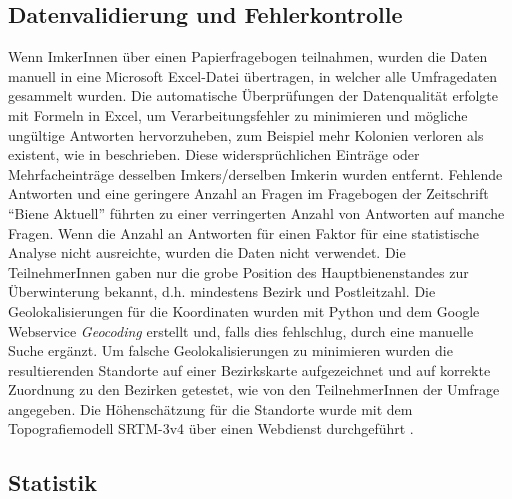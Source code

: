 \subsection{Datenvalidierung und Fehlerkontrolle}

Wenn ImkerInnen über einen Papierfragebogen teilnahmen, wurden die Daten manuell in eine Microsoft Excel-Datei übertragen, in welcher alle Umfragedaten gesammelt wurden. Die automatische Überprüfungen der Datenqualität erfolgte mit Formeln in Excel, um Verarbeitungsfehler zu minimieren und mögliche ungültige Antworten hervorzuheben, zum Beispiel mehr Kolonien verloren als existent, wie in \cite{vanderzee2013, brodschneider2013} beschrieben. Diese widersprüchlichen Einträge oder Mehrfacheinträge desselben Imkers/derselben Imkerin wurden entfernt. Fehlende Antworten und eine geringere Anzahl an Fragen im Fragebogen der Zeitschrift \enquote{Biene Aktuell} führten zu einer verringerten Anzahl von Antworten auf manche Fragen. Wenn die Anzahl an Antworten für einen Faktor für eine statistische Analyse nicht ausreichte, wurden die Daten nicht verwendet.
\newline
Die TeilnehmerInnen gaben nur die grobe Position des Hauptbienenstandes zur Überwinterung bekannt, d.h. mindestens Bezirk und Postleitzahl. Die Geolokalisierungen für die Koordinaten wurden mit Python und dem Google Webservice \emph{Geocoding} erstellt und, falls dies fehlschlug, durch eine manuelle Suche ergänzt. Um falsche Geolokalisierungen zu minimieren wurden die resultierenden Standorte  auf einer Bezirkskarte aufgezeichnet und auf korrekte Zuordnung zu den Bezirken getestet, wie von den TeilnehmerInnen der Umfrage angegeben. Die Höhenschätzung für die Standorte wurde mit dem Topografiemodell SRTM-3v4 über einen Webdienst durchgeführt \citep{geonames}.

\subsection{Statistik}

